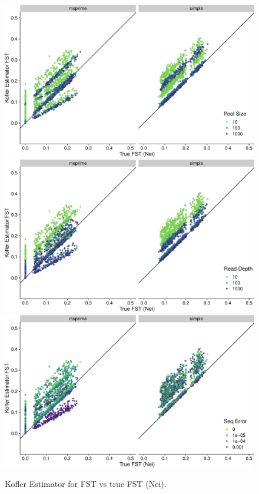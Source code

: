 \documentclass[a4paper,fontsize=9pt,DIV=14]{scrartcl}
\begin{document}
\begin{figure}[p]
    \centering
    \includegraphics[width=.75\linewidth]{true_nei_fst-est_kofler-pool_size.pdf}
    \includegraphics[width=.75\linewidth]{true_nei_fst-est_kofler-read_depth.pdf}
    \includegraphics[width=.75\linewidth]{true_nei_fst-est_kofler-seq_error.pdf}
    \vspace*{-1em}
    \caption{
        Kofler Estimator for FST vs true FST (Nei).
    }
\label{fig:Kofler}
\end{figure}
\end{document}
